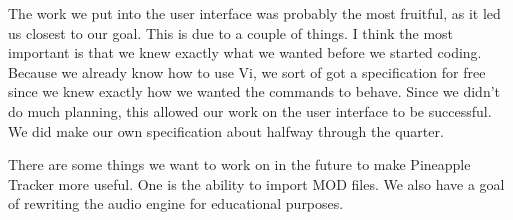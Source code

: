 \documentclass[12pt,letterpaper]{article}
\begin{document}
\par
The work we put into the user interface was probably the most fruitful, as it led us closest to our goal. This is due to a couple of things. I think the most important is that we knew exactly what we wanted before we started coding. Because we already know how to use Vi, we sort of got a specification for free since we knew exactly how we wanted the commands to behave. Since we didn't do much planning, this allowed our work on the user interface to be successful. We did make our own specification about halfway through the quarter.

\par
There are some things we want to work on in the future to make Pineapple Tracker more useful. One is the ability to import MOD files. We also have a goal of rewriting the audio engine for educational purposes.
\end{document}
